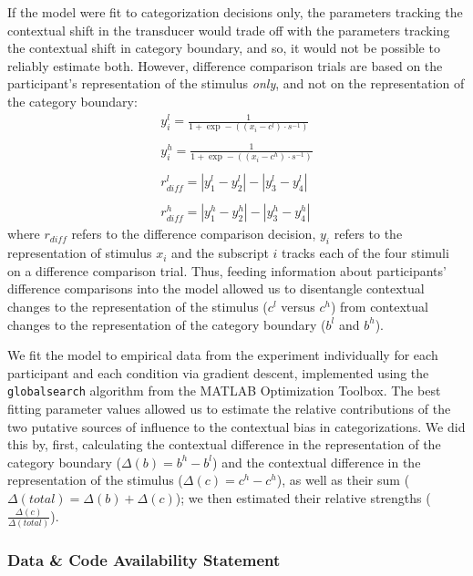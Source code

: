 \documentclass[a4paper, nobind]{templates/ociamthesis}
\begin{document}
If the model were fit to categorization decisions only, the parameters tracking the contextual shift in the transducer would trade off with the parameters tracking the contextual shift in category boundary, and so, it would not be possible to reliably estimate both. However, difference comparison trials are based on the participant's representation of the stimulus \emph{only}, and not on the representation of the category boundary:
\begin{equation}
\begin{aligned}
y_i^l = \frac{1}{1+\exp-((x_i-c^l) \cdot s^{-1})} \\
\\
y_i^h = \frac{1}{1+\exp-((x_i-c^h) \cdot s^{-1})} \\
\\
r_{diff}^l = |y_1^l - y_2^l| - |y_3^l - y_4^l| \\
\\
r_{diff}^h = |y_1^h - y_2^h| - |y_3^h - y_4^h|
\end{aligned}
\end{equation}
where \(r_{diff}\) refers to the difference comparison decision, \(y_i\) refers to the representation of stimulus \(x_i\) and the subscript \(i\) tracks each of the four stimuli on a difference comparison trial. Thus, feeding information about participants' difference comparisons into the model allowed us to disentangle contextual changes to the representation of the stimulus (\(c^l\) versus \(c^h\)) from contextual changes to the representation of the category boundary (\(b^l\) and \(b^h\)).

We fit the model to empirical data from the experiment individually for each participant and each condition via gradient descent, implemented using the \texttt{globalsearch} algorithm from the MATLAB Optimization Toolbox. The best fitting parameter values allowed us to estimate the relative contributions of the two putative sources of influence to the contextual bias in categorizations. We did this by, first, calculating the contextual difference in the representation of the category boundary (\(\Delta(b)=b^h-b^l\)) and the contextual difference in the representation of the stimulus (\(\Delta(c)=c^h-c^h\)), as well as their sum (\(\Delta(total)=\Delta(b)+\Delta(c)\)); we then estimated their relative strengths (\(\frac{\Delta(c)}{\Delta(total)}\)).

\hypertarget{data-code-availability-statement-5}{%
\subsubsection{Data \& Code Availability Statement}\label{data-code-availability-statement-5}}
\end{document}
